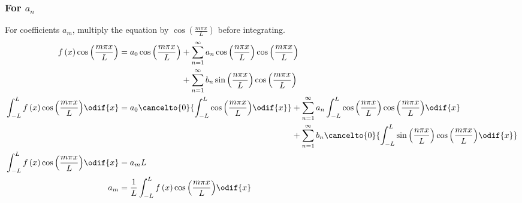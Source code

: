 \documentclass{article}
\begin{document}
\subsubsection{For \texorpdfstring{\(a_n\)}{an}}
For coefficients \(a_m\), multiply the equation by \(\cos{\left( \frac{m \pi x}{L} \right)}\) before integrating.
\begin{align*}
    f\left( x \right) \cos{\left( \frac{m \pi x}{L} \right)}                      & =
    \begin{aligned}[t]
        a_0 \cos{\left( \frac{m \pi x}{L} \right)} & + \sum_{n = 1}^\infty a_n \cos{\left( \frac{n \pi x}{L} \right)} \cos{\left( \frac{m \pi x}{L} \right)} \\
                                                   & + \sum_{n = 1}^\infty b_n \sin{\left( \frac{n \pi x}{L} \right)} \cos{\left( \frac{m \pi x}{L} \right)}
    \end{aligned}
    \\
    \int_{-L}^L f\left( x \right) \cos{\left( \frac{m \pi x}{L} \right)} \odif{x} & =
    \begin{aligned}[t]
        a_0 \cancelto{0}{\int_{-L}^L \cos{\left( \frac{m \pi x}{L} \right)} \odif{x}} & + \sum_{n = 1}^\infty a_n \int_{-L}^L \cos{\left( \frac{n \pi x}{L} \right)} \cos{\left( \frac{m \pi x}{L} \right)} \odif{x}               \\
                                                                                      & + \sum_{n = 1}^\infty b_n \cancelto{0}{\int_{-L}^L \sin{\left( \frac{n \pi x}{L} \right)} \cos{\left( \frac{m \pi x}{L} \right)} \odif{x}}
    \end{aligned}
    \\
    \int_{-L}^L f\left( x \right) \cos{\left( \frac{m \pi x}{L} \right)} \odif{x} & = a_m L                                                                                     \\
    a_m                                                                           & = \frac{1}{L} \int_{-L}^L f\left( x \right) \cos{\left( \frac{m \pi x}{L} \right)} \odif{x}
\end{align*}
\end{document}
